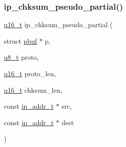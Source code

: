 \subsubsection{\texorpdfstring{ip\+\_\+chksum\+\_\+pseudo\+\_\+partial()}{ip\_chksum\_pseudo\_partial()}}
{\footnotesize\ttfamily \hyperlink{group__compiler__abstraction_ga77570ac4fcab86864fa1916e55676da2}{u16\+\_\+t} ip\+\_\+chksum\+\_\+pseudo\+\_\+partial (\begin{DoxyParamCaption}\item[{struct \hyperlink{structpbuf}{pbuf} $\ast$}]{p,  }\item[{\hyperlink{group__compiler__abstraction_ga4caecabca98b43919dd11be1c0d4cd8e}{u8\+\_\+t}}]{proto,  }\item[{\hyperlink{group__compiler__abstraction_ga77570ac4fcab86864fa1916e55676da2}{u16\+\_\+t}}]{proto\+\_\+len,  }\item[{\hyperlink{group__compiler__abstraction_ga77570ac4fcab86864fa1916e55676da2}{u16\+\_\+t}}]{chksum\+\_\+len,  }\item[{const \hyperlink{native_2lwip_2src_2include_2lwip_2ip__addr_8h_a88b43639738c4de2d3cd22e3a1fd7696}{ip\+\_\+addr\+\_\+t} $\ast$}]{src,  }\item[{const \hyperlink{native_2lwip_2src_2include_2lwip_2ip__addr_8h_a88b43639738c4de2d3cd22e3a1fd7696}{ip\+\_\+addr\+\_\+t} $\ast$}]{dest }\end{DoxyParamCaption})}

